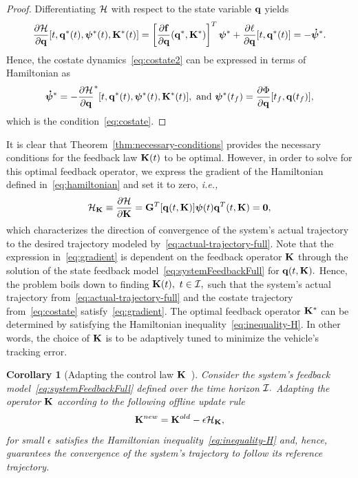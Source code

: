 \documentclass[
12pt,draftcls,onecolumn%
]{IEEEtran}
\newtheorem{corollary}{Corollary}
\begin{document}
\begin{proof}
Differentiating ${\cal H}$ with respect to the state variable ${\bf q}$ yields
\begin{equation*}
\frac{\partial{\cal H}}{\partial{\bf q}}[t,{\bf q}^*(t),\boldsymbol{\psi}^*(t),{\bf K}^*(t)] =\left[\frac{\partial{\bf f}}{\partial{\bf q}}({\bf q}^*,{\bf K}^*)\right]^T\boldsymbol{\psi}^*+\frac{\partial\ell}{\partial{\bf q}}[t,{\bf q}^*(t)] = -\boldsymbol{\dot\psi}^*.
\end{equation*}
Hence, the costate dynamics~\eqref{eq:costate2} can be expressed in terms of Hamiltonian as
\begin{equation*}
\begin{split}
\boldsymbol{\dot\psi}^* = -\frac{\partial{\cal H}}{\partial{\bf q}}^* [t,{\bf q}^*(t),\boldsymbol{\psi}^*(t),{\bf K}^*(t)],~\text{and}~
\boldsymbol{\psi}^*(t_f) = \frac{\partial\Phi}{\partial{\bf q}}[t_f,{\bf q}(t_f)],
\end{split}
\end{equation*}
which is the condition~\eqref{eq:costate}. 
\end{proof}
%
It is clear that Theorem~\ref{thm:necessary-conditions} provides the necessary conditions for the feedback law ${\bf K}(t)$ to be optimal. However, in order to solve for this optimal feedback operator, we express the gradient of the Hamiltonian defined in~\eqref{eq:hamiltonian} and set it to zero, \textit{i.e.,}
%
\begin{align}
\mathcal{H}_{{\bf K}}\equiv\frac{\partial {\cal H}}{\partial {\bf K}} = {\bf G}^T[{\bf q}(t,{\bf K})]\bm{\psi}(t) {\bf q}^T(t,{\bf K})={\bf 0},
\label{eq:gradient}
\end{align}
which characterizes the direction of convergence of the system's actual trajectory to the desired trajectory modeled by~\eqref{eq:actual-trajectory-full}. Note that the expression in~\eqref{eq:gradient} is dependent on the feedback operator  ${\bf K}$ through the solution of the state feedback model~\eqref{eq:systemFeedbackFull} for ${\bf q}(t,{\bf K}).$  Hence, the problem boils down to finding ${\bf K}(t),~t\in{\cal I},$ such that the system's actual trajectory from~\eqref{eq:actual-trajectory-full} and the costate trajectory from~\eqref{eq:costate} satisfy~\eqref{eq:gradient}. The optimal feedback operator  ${\bf K}^*$ can be determined by satisfying the Hamiltonian inequality~\eqref{eq:inequality-H}. In other words, the choice of ${\bf K}$ is to be adaptively tuned to minimize the vehicle's tracking error. 

\begin{corollary}[Adapting the control law ${\bf K}$~]
\label{cor:convergence}
Consider the system's feedback model~\eqref{eq:systemFeedbackFull} defined over the time horizon ${\cal I}.$ Adapting the operator ${\bf K}$ according to the following offline update rule 
\begin{equation}
{\bf K}^{new} = {\bf K}^{old} - \epsilon \mathcal{H}_{{\bf K}},
\label{eq:update-rule}
\end{equation}
for small $\epsilon$ satisfies the Hamiltonian inequality~\eqref{eq:inequality-H} and, hence, guarantees the convergence of the system's trajectory to follow its reference trajectory. 
\end{corollary}
\end{document}
